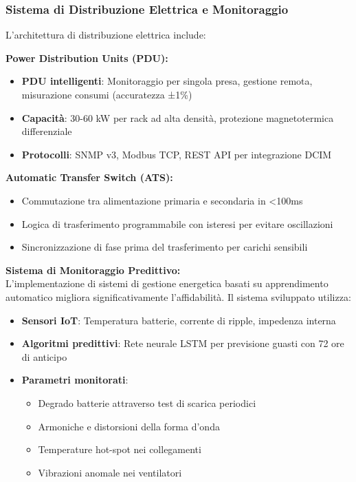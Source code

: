 \subsubsection{Sistema di Distribuzione Elettrica e Monitoraggio}

L'architettura di distribuzione elettrica include:

\textbf{Power Distribution Units (PDU):}
\begin{itemize}
    \item \textbf{PDU intelligenti}: Monitoraggio per singola presa, gestione remota, misurazione consumi (accuratezza ±1\%)
    \item \textbf{Capacità}: 30-60 kW per rack ad alta densità, protezione magnetotermica differenziale
    \item \textbf{Protocolli}: SNMP v3, Modbus TCP, REST API per integrazione DCIM
\end{itemize}

\textbf{Automatic Transfer Switch (ATS):}
\begin{itemize}
    \item Commutazione tra alimentazione primaria e secondaria in <100ms
    \item Logica di trasferimento programmabile con isteresi per evitare oscillazioni
    \item Sincronizzazione di fase prima del trasferimento per carichi sensibili
\end{itemize}

\textbf{Sistema di Monitoraggio Predittivo:}\\
L'implementazione di sistemi di gestione energetica basati su apprendimento automatico migliora significativamente l'affidabilità\autocite{GoogleDeepMind2024}. Il sistema sviluppato utilizza:

\begin{itemize}
    \item \textbf{Sensori IoT}: Temperatura batterie, corrente di ripple, impedenza interna
    \item \textbf{Algoritmi predittivi}: Rete neurale LSTM per previsione guasti con 72 ore di anticipo
    \item \textbf{Parametri monitorati}: 
    \begin{itemize}
        \item Degrado batterie attraverso test di scarica periodici
        \item Armoniche e distorsioni della forma d'onda
        \item Temperature hot-spot nei collegamenti
        \item Vibrazioni anomale nei ventilatori
    \end{itemize}
\end{itemize}

